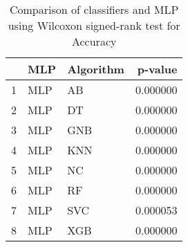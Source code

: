 \begin{table}
\footnotesize
\caption{Comparison of classifiers and MLP using Wilcoxon signed-rank test for Accuracy}
\label{tab:MLP wilcoxon Accuracy comparison}
\begin{tabular}{lllr}
\hline
 & MLP & Algorithm & p-value \\
\hline
1 & MLP & AB & 0.000000 \\
2 & MLP & DT & 0.000000 \\
3 & MLP & GNB & 0.000000 \\
4 & MLP & KNN & 0.000000 \\
5 & MLP & NC & 0.000000 \\
6 & MLP & RF & 0.000000 \\
7 & MLP & SVC & 0.000053 \\
8 & MLP & XGB & 0.000000 \\
\hline
\end{tabular}
\end{table}
